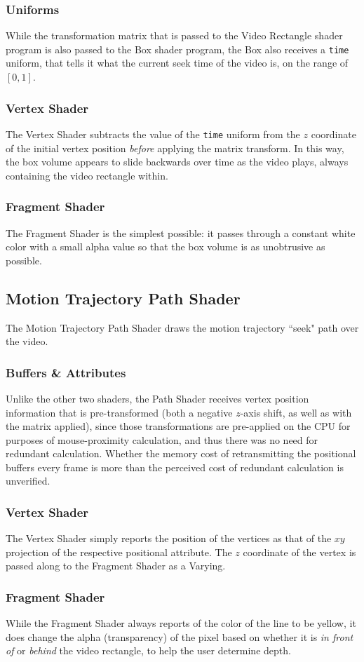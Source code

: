 \subsubsection{Uniforms}
While the transformation matrix that is passed to the Video Rectangle shader program is also passed to the Box shader program, the Box also receives a \texttt{time} uniform, that tells it what the current seek time of the video is, on the range of $[0,1]$.

\subsubsection{Vertex Shader}
The Vertex Shader subtracts the value of the \texttt{time} uniform from the $z$ coordinate of the initial vertex position \emph{before} applying the matrix transform. In this way, the box volume appears to slide backwards over time as the video plays, always containing the video rectangle within.

\subsubsection{Fragment Shader}
The Fragment Shader is the simplest possible: it passes through a constant white color with a small alpha value so that the box volume is as unobtrusive as possible.


\subsection{Motion Trajectory Path Shader}
The Motion Trajectory Path Shader draws the motion trajectory ``seek" path over the video.

\subsubsection{Buffers \& Attributes}
Unlike the other two shaders, the Path Shader receives vertex position information that is pre-transformed (both a negative $z$-axis shift, as well as with the matrix applied), since those transformations are pre-applied on the CPU for purposes of mouse-proximity calculation, and thus there was no need for redundant calculation. Whether the memory cost of retransmitting the positional buffers every frame is more than the perceived cost of redundant calculation is unverified.

\subsubsection{Vertex Shader}
The Vertex Shader simply reports the position of the vertices as that of the $xy$ projection of the respective positional attribute. The $z$ coordinate of the vertex is passed along to the Fragment Shader as a Varying.

\subsubsection{Fragment Shader}
While the Fragment Shader always reports of the color of the line to be yellow, it does change the alpha (transparency) of the pixel based on whether it is \emph{in front of} or \emph{behind} the video rectangle, to help the user determine depth.
